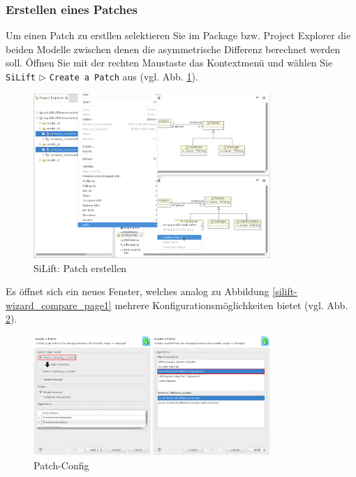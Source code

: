 \subsubsection{Erstellen eines Patches}

Um einen Patch zu erstllen selektieren Sie im Package bzw. Project Explorer die beiden Modelle zwischen denen die asymmetrische Differenz berechnet werden soll.
Öffnen Sie mit der rechten Maustaste das Kontextmenü und wählen Sie \texttt{SiLift} $\triangleright$ \texttt{Create a Patch} aus (vgl. Abb. \ref{silift-tutorial_patching_contextmenu_create}).

\begin{figure}[H]
\centering
\includegraphics[width=0.8\textwidth]{patching/graphics/silift-tutorial_patching_contextmenu_create.png}
\caption{SiLift: Patch erstellen}
\label{silift-tutorial_patching_contextmenu_create}
\end{figure}

Es öffnet sich ein neues Fenster, welches analog zu Abbildung \ref{silift-wizard_compare_page1} mehrere Konfigurationsmöglichkeiten bietet (vgl. Abb. \ref{silift-tutorial_patching_create_config}).


\begin{figure}[H]
\centering
\includegraphics[width=0.8\textwidth]{patching/graphics/silift-tutorial_patching_create_config.png}
\caption{Patch-Config}
\label{silift-tutorial_patching_create_config}
\end{figure}

